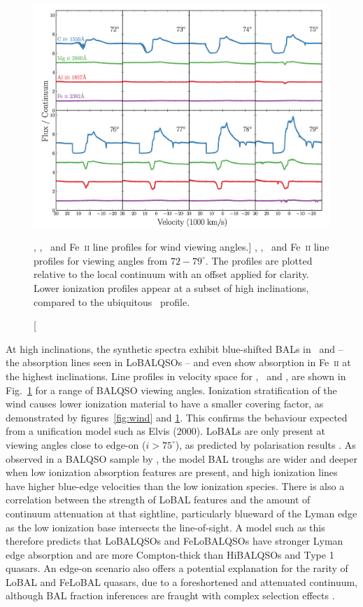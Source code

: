 \begin{figure}
\centering
\includegraphics[width=1.0\textwidth]{figures/06-agnpaper/fig7.png}
\caption
[\civ , \mg , \al\ and Fe~\textsc{ii} line profiles for wind viewing angles.]
{
\civ , \mg , \al\ and Fe~\textsc{ii} line profiles for viewing angles
from $72-79^\circ$. The profiles are plotted relative to the local
continuum with an offset applied for clarity. Lower ionization
profiles appear at a subset of high inclinations, compared
to the ubiquitous \civ\ profile.
}
\label{fig:lobal}
\end{figure}


At high inclinations, the synthetic spectra exhibit 
blue-shifted BALs in \al\ and \mg --
the absorption lines seen in LoBALQSOs -- 
and even show absorption in Fe~\textsc{ii}
at the highest inclinations. Line profiles in velocity space 
for \civ, \al\ and \mg, are shown in Fig.~\ref{fig:lobal} for a range
of BALQSO viewing angles. Ionization stratification
of the wind causes lower ionization material to have a 
smaller covering factor, 
as demonstrated by figures~\ref{fig:wind} and \ref{fig:lobal}.
This confirms the behaviour expected from a unification model such as Elvis (2000). 
LoBALs are only present at viewing angles close to edge-on ($i>75^\circ$),
as predicted by polarisation results \citep{brotherton1997}.
As observed in a BALQSO sample by \cite{filizak2014}, 
the model BAL troughs are wider and deeper when low ionization 
absorption features are present,
and high ionization lines have higher blue-edge velocities than the 
low ionization species.
There is also a correlation between the strength of LoBAL features
and the amount of continuum attenuation at that sightline, particularly
blueward of the Lyman edge as the low ionization base 
intersects the line-of-sight. 
A model such as this therefore predicts that LoBALQSOs and FeLoBALQSOs 
have stronger Lyman edge absorption and 
are more Compton-thick than HiBALQSOs and Type 1 quasars.
An edge-on scenario also offers a potential explanation for the rarity of LoBAL and
FeLoBAL quasars, due to a foreshortened and attenuated continuum, 
although BAL fraction inferences are fraught with complex selection 
effects \citep{goodrich1997,krolikvoit1998}.


